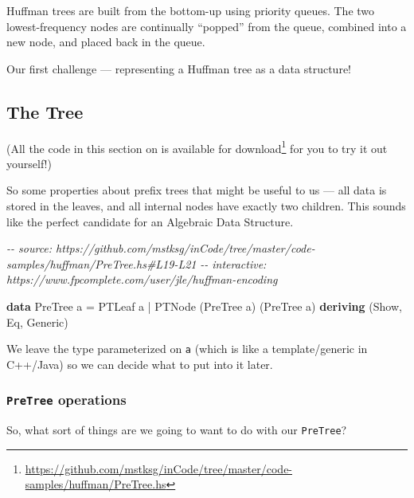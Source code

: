 \documentclass[]{article}
\newenvironment{Shaded}{}{}
\newcommand{\CommentTok}[1]{\textcolor[rgb]{0.38,0.63,0.69}{\textit{#1}}}
\newcommand{\DataTypeTok}[1]{\textcolor[rgb]{0.56,0.13,0.00}{#1}}
\newcommand{\KeywordTok}[1]{\textcolor[rgb]{0.00,0.44,0.13}{\textbf{#1}}}
\newcommand{\NormalTok}[1]{#1}
\newcommand{\OperatorTok}[1]{\textcolor[rgb]{0.40,0.40,0.40}{#1}}
\newcommand{\OtherTok}[1]{\textcolor[rgb]{0.00,0.44,0.13}{#1}}
\renewcommand{\href}[2]{#2\footnote{\url{#1}}}
\begin{document}
Huffman trees are built from the bottom-up using priority queues. The two
lowest-frequency nodes are continually ``popped'' from the queue, combined into
a new node, and placed back in the queue.

Our first challenge --- representing a Huffman tree as a data structure!

\hypertarget{the-tree}{%
\subsection{The Tree}\label{the-tree}}

(All the code in this section on is
\href{https://github.com/mstksg/inCode/tree/master/code-samples/huffman/PreTree.hs}{available
for download} for you to try it out yourself!)

So some properties about prefix trees that might be useful to us --- all data is
stored in the leaves, and all internal nodes have exactly two children. This
sounds like the perfect candidate for an Algebraic Data Structure.

\begin{Shaded}
\begin{Highlighting}[]
\CommentTok{{-}{-} source: https://github.com/mstksg/inCode/tree/master/code{-}samples/huffman/PreTree.hs\#L19{-}L21}
\CommentTok{{-}{-} interactive: https://www.fpcomplete.com/user/jle/huffman{-}encoding}

\KeywordTok{data} \DataTypeTok{PreTree}\NormalTok{ a }\OtherTok{=} \DataTypeTok{PTLeaf}\NormalTok{ a}
               \OperatorTok{|} \DataTypeTok{PTNode}\NormalTok{ (}\DataTypeTok{PreTree}\NormalTok{ a) (}\DataTypeTok{PreTree}\NormalTok{ a)}
               \KeywordTok{deriving}\NormalTok{ (}\DataTypeTok{Show}\NormalTok{, }\DataTypeTok{Eq}\NormalTok{, }\DataTypeTok{Generic}\NormalTok{)}
\end{Highlighting}
\end{Shaded}

We leave the type parameterized on \texttt{a} (which is like a template/generic
in C++/Java) so we can decide what to put into it later.

\hypertarget{pretree-operations}{%
\subsubsection{\texorpdfstring{\texttt{PreTree}
operations}{PreTree operations}}\label{pretree-operations}}

So, what sort of things are we going to want to do with our \texttt{PreTree}?
\end{document}

